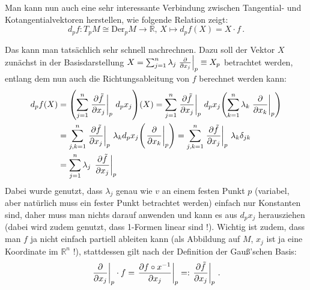 \documentclass[../H_Analysis_main.tex]{subfiles}
\begin{document}
\begin{bsp}\label{bsp:fktkeimderiv}
Man kann nun auch eine sehr interessante Verbindung zwischen Tangential- und Kotangentialvektoren herstellen, wie folgende Relation zeigt:
\begin{equation}
d_p f: T_p M \cong \text{Der}_p M \rightarrow \mathbb{R}, \, X \mapsto d_p f(X) = X \cdot f \, .
\end{equation}

Das kann man tatsächlich sehr schnell nachrechnen. Dazu soll der Vektor $X$ zunächst in der Basisdarstellung $X = \sum_{j = 1}^n \lambda_j \eval{\pdv{x_j}}_p \equiv X_p$ betrachtet werden, entlang dem nun auch die Richtungsableitung von $f$ berechnet werden kann:
\begin{align*}
d_p f(X) &= \qty(\sum_{j = 1}^n \eval{\pdv{\tilde{f}}{x_j}}_p \, d_p x_j)(X) = \sum_{j = 1}^n \eval{\pdv{\tilde{f}}{x_j}}_p \, d_p x_j \qty(\sum_{k = 1}^n \lambda_k \eval{\pdv{x_k}}_p)
\\
&= \sum_{j, k = 1}^n \eval{\pdv{\tilde{f}}{x_j}}_p \, \lambda_k d_p x_j \qty(\eval{\pdv{x_k}}_p) = \sum_{j, k = 1}^n \eval{\pdv{\tilde{f}}{x_j}}_p \, \lambda_k \delta_{jk}
\\
&= \sum_{j = 1}^n \lambda_j \, \eval{\pdv{\tilde{f}}{x_j}}_p
\end{align*}
Dabei wurde genutzt, dass $\lambda_j$ genau wie $v$ an einem festen Punkt $p$ (variabel, aber natürlich muss ein fester Punkt betrachtet werden) einfach nur Konstanten sind, daher muss man nichts darauf anwenden und kann es aus $d_p x_j$ herausziehen (dabei wird zudem genutzt, dass 1-Formen linear sind !). Wichtig ist zudem, dass man $f$ ja nicht einfach partiell ableiten kann (als Abbildung auf $M$, $x_j$ ist ja eine Koordinate im $\mathbb{R}^n$ !), stattdessen gilt nach der Definition der Gauß'schen Basis:
\begin{equation}
\eval{\pdv{x_j}}_p \cdot f = \eval{\pdv{f \circ x^{-1}}{x_j}}_p =: \eval{\pdv{\tilde{f}}{x_j}}_p \, .
\end{equation}


\end{bsp}
\end{document}
